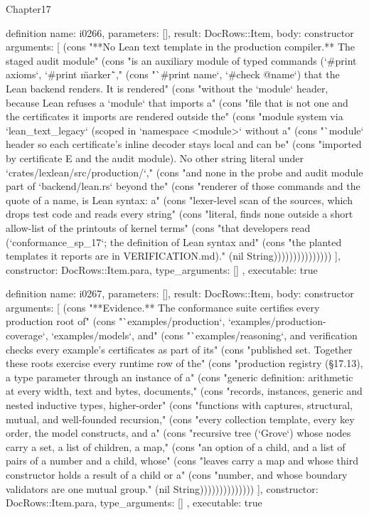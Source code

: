 \begin{lexlean}{Chapter17}
\begin{semanticmodule}
definition{
  name: i0266,
  parameters: [],
  result: DocRows::Item,
  body: constructor{
    arguments: [
      (cons "**No Lean text template in the production compiler.** The staged audit module" (cons "is an auxiliary module of typed commands (`#print axioms`, `#print \"marker\"`," (cons "`#print name`, `#check @name`) that the Lean backend renders. It is rendered" (cons "without the `module` header, because Lean refuses a `module` that imports a" (cons "file that is not one and the certificates it imports are rendered outside the" (cons "module system via `lean_text_legacy` (scoped in `namespace <module>` without a" (cons "`module` header so each certificate's inline decoder stays local and can be" (cons "imported by certificate E and the audit module). No other string literal under `crates/lexlean/src/production/`," (cons "and none in the probe and audit module part of `backend/lean.rs` beyond the" (cons "renderer of those commands and the quote of a name, is Lean syntax: a" (cons "lexer-level scan of the sources, which drops test code and reads every string" (cons "literal, finds none outside a short allow-list of the printouts of kernel terms" (cons "that developers read (`conformance_sp_17`; the definition of Lean syntax and" (cons "the planted templates it reports are in VERIFICATION.md)." (nil String)))))))))))))))
    ],
    constructor: DocRows::Item.para,
    type_arguments: []
  },
  executable: true
}

definition{
  name: i0267,
  parameters: [],
  result: DocRows::Item,
  body: constructor{
    arguments: [
      (cons "**Evidence.** The conformance suite certifies every production root of" (cons "`examples/production`, `examples/production-coverage`, `examples/models`, and" (cons "`examples/reasoning`, and verification checks every example's certificates as part of its" (cons "published set. Together these roots exercise every runtime row of the" (cons "production registry (§17.13), a type parameter through an instance of a" (cons "generic definition: arithmetic at every width, text and bytes, documents," (cons "records, instances, generic and nested inductive types, higher-order" (cons "functions with captures, structural, mutual, and well-founded recursion," (cons "every collection template, every key order, the model constructs, and a" (cons "recursive tree (`Grove`) whose nodes carry a set, a list of children, a map," (cons "an option of a child, and a list of pairs of a number and a child, whose" (cons "leaves carry a map and whose third constructor holds a result of a child or a" (cons "number, and whose boundary validators are one mutual group." (nil String))))))))))))))
    ],
    constructor: DocRows::Item.para,
    type_arguments: []
  },
  executable: true
}


\end{semanticmodule}
\end{lexlean}
